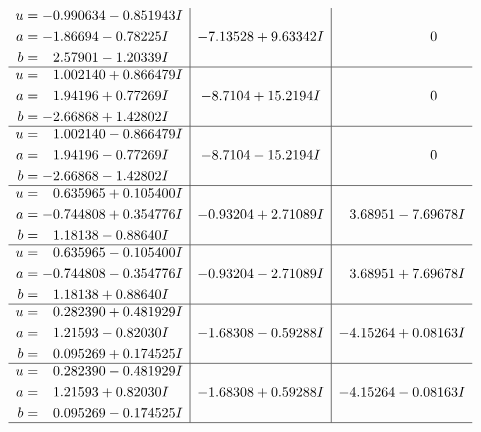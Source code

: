 \documentclass[1p]{elsarticle_modified}
\theoremstyle{definition}
\begin{document}
$$\begin{array}{c|c|c}
\begin{aligned}
u &= -0.990634 - 0.851943 I \\
a &= -1.86694 - 0.78225 I \\
b &= \phantom{-}2.57901 - 1.20339 I\end{aligned}
 & -7.13528 + 9.63342 I & \phantom{-0.000000 } 0 \\ \hline\begin{aligned}
u &= \phantom{-}1.002140 + 0.866479 I \\
a &= \phantom{-}1.94196 + 0.77269 I \\
b &= -2.66868 + 1.42802 I\end{aligned}
 & -8.7104 + 15.2194 I & \phantom{-0.000000 } 0 \\ \hline\begin{aligned}
u &= \phantom{-}1.002140 - 0.866479 I \\
a &= \phantom{-}1.94196 - 0.77269 I \\
b &= -2.66868 - 1.42802 I\end{aligned}
 & -8.7104 - 15.2194 I & \phantom{-0.000000 } 0 \\ \hline\begin{aligned}
u &= \phantom{-}0.635965 + 0.105400 I \\
a &= -0.744808 + 0.354776 I \\
b &= \phantom{-}1.18138 - 0.88640 I\end{aligned}
 & -0.93204 + 2.71089 I & \phantom{-}3.68951 - 7.69678 I \\ \hline\begin{aligned}
u &= \phantom{-}0.635965 - 0.105400 I \\
a &= -0.744808 - 0.354776 I \\
b &= \phantom{-}1.18138 + 0.88640 I\end{aligned}
 & -0.93204 - 2.71089 I & \phantom{-}3.68951 + 7.69678 I \\ \hline\begin{aligned}
u &= \phantom{-}0.282390 + 0.481929 I \\
a &= \phantom{-}1.21593 - 0.82030 I \\
b &= \phantom{-}0.095269 + 0.174525 I\end{aligned}
 & -1.68308 - 0.59288 I & -4.15264 + 0.08163 I \\ \hline\begin{aligned}
u &= \phantom{-}0.282390 - 0.481929 I \\
a &= \phantom{-}1.21593 + 0.82030 I \\
b &= \phantom{-}0.095269 - 0.174525 I\end{aligned}
 & -1.68308 + 0.59288 I & -4.15264 - 0.08163 I\\
 \hline 
 \end{array}$$\newpage\newpage\renewcommand{\arraystretch}{1}
\end{document}
